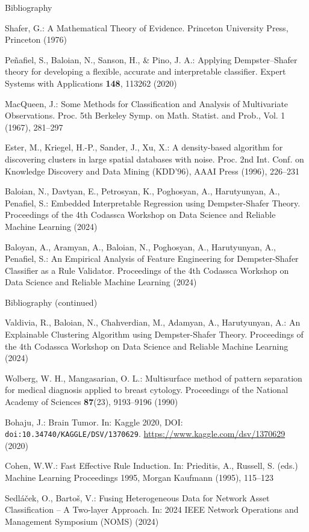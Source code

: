 \documentclass[aspectratio=169]{beamer}
\newcommand{\doi}[1]{\texttt{doi:#1}}
\begin{document}
\begin{frame}{Bibliography}
\begin{thebibliography}{8}
{\rm
{}
Shafer, G.: A Mathematical Theory of Evidence. Princeton University Press, Princeton (1976)

Peñafiel, S., Baloian, N., Sanson, H., \& Pino, J. A.: Applying Dempster–Shafer theory for developing a flexible, accurate and interpretable classifier. Expert Systems with Applications \textbf{148}, 113262 (2020)

MacQueen, J.: Some Methods for Classification and Analysis of Multivariate Observations. Proc. 5th Berkeley Symp. on Math. Statist. and Prob., Vol. 1 (1967), 281--297

Ester, M., Kriegel, H.-P., Sander, J., Xu, X.: A density-based algorithm for discovering clusters in large spatial databases with noise. Proc. 2nd Int. Conf. on Knowledge Discovery and Data Mining (KDD'96), AAAI Press (1996), 226--231

Baloian, N., Davtyan, E., Petrosyan, K., Poghosyan, A., Harutyunyan, A., Penafiel, S.: Embedded Interpretable Regression using Dempster-Shafer Theory. Proceedings of the 4th Codassca Workshop on Data Science and Reliable Machine Learning (2024)

Baloyan, A., Aramyan, A., Baloian, N., Poghosyan, A., Harutyunyan, A., Penafiel, S.: An Empirical Analysis of Feature Engineering for Dempster-Shafer Classifier as a Rule Validator. Proceedings of the 4th Codassca Workshop on Data Science and Reliable Machine Learning (2024)
}
\end{thebibliography}
\end{frame}

\begin{frame}{Bibliography (continued)}
\begin{thebibliography}{8}
{\rm
\setcounter{enumiv}{6}
Valdivia, R., Baloian, N., Chahverdian, M., Adamyan, A., Harutyunyan, A.: An Explainable Clustering Algorithm using Dempster-Shafer Theory. Proceedings of the 4th Codassca Workshop on Data Science and Reliable Machine Learning (2024)

Wolberg, W. H., Mangasarian, O. L.: Multisurface method of pattern separation for medical diagnosis applied to breast cytology. Proceedings of the National Academy of Sciences \textbf{87}(23), 9193--9196 (1990)

Bohaju, J.: Brain Tumor. In: Kaggle 2020, DOI: \doi{10.34740/KAGGLE/DSV/1370629}. \url{https://www.kaggle.com/dsv/1370629} (2020)

Cohen, W.W.: Fast Effective Rule Induction. In: Prieditis, A., Russell, S. (eds.) Machine Learning Proceedings 1995, Morgan Kaufmann (1995), 115--123

Sedláček, O., Bartoš, V.: Fusing Heterogeneous Data for Network Asset Classification – A Two-layer Approach. In: 2024 IEEE Network Operations and Management Symposium (NOMS) (2024)
}
\end{thebibliography}
\end{frame}
\end{document}
